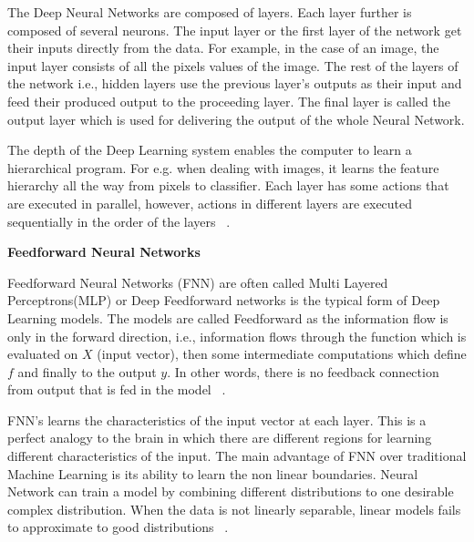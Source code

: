\noindent The Deep Neural Networks are composed of layers. Each layer further is composed of several neurons. The input layer or the first layer of the network get their inputs directly from the data. For
example, in the case of an image, the input layer consists of all the pixels values of the image. The rest of the layers of the network i.e., hidden layers use the previous layer's outputs as their input and feed their produced output to the proceeding layer. The final layer is called the output layer which is used for delivering the output of the whole Neural Network.

The depth of the Deep Learning system enables the computer to learn a hierarchical program. For e.g. when dealing with images, it learns the feature hierarchy all the way from pixels to classifier. Each layer has some actions
that are executed in parallel, however,  actions in different layers are executed sequentially in the order of the layers ~\cite{Goodfellow-et-al-2016}. 
\newline

\noindent \textbf{Feedforward Neural Networks}
\newline

\noindent Feedforward Neural Networks (FNN) are often called Multi Layered Perceptrons(MLP) or Deep Feedforward networks is the typical form of Deep Learning models. The models are called Feedforward as the information flow is only in the forward direction, i.e., information flows through the function which is evaluated on \(X\) (input vector), then some intermediate computations which define \(f\) and finally to the output \(y\). In other words, there is no feedback connection from output that is fed in the model ~\cite{Goodfellow-et-al-2016}.

FNN's learns the characteristics of the input vector at each layer. This is a perfect analogy to the brain in which there are different regions for learning different characteristics of the input. The main advantage of FNN over traditional Machine Learning is its ability to learn the non linear boundaries. Neural Network can train a model by combining different distributions to one desirable complex distribution. When the data is not linearly separable, linear models fails to approximate to good distributions ~\cite{Goodfellow-et-al-2016}. 

